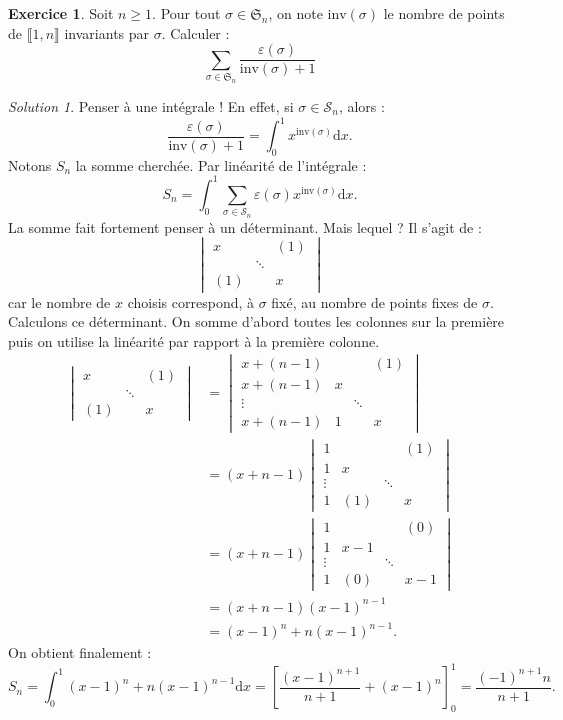 \documentclass[french]{book}
\renewcommand{\d}{\text{d}}
\theoremstyle{definition}
\newtheorem{ex}{Exercice}[chapter]
\theoremstyle{remark}
\newtheorem*{sol}{Solution}
\begin{document}
\begin{ex}
	Soit $n\geqslant1$. Pour tout $\sigma\in\mathfrak{S}_n$, on note $\text{inv}(\sigma)$ le nombre de points de $\llbracket1,n\rrbracket$ invariants par $\sigma$. Calculer : $$\sum_{\sigma\in\mathfrak{S}_n}\frac{\varepsilon(\sigma)}{\text{inv}(\sigma)+1}$$
\end{ex}
\begin{sol}
	Penser à une intégrale ! En effet, si $\sigma\in\mathcal{S}_n$, alors :
	$$\frac{\varepsilon(\sigma)}{\text{inv}(\sigma)+1}=\int_{0}^{1}x^{\text{inv}(\sigma)}\d x.$$ Notons $S_n$ la somme cherchée. Par linéarité de l'intégrale :
	$$S_n=\int_{0}^{1}\sum_{\sigma\in\mathcal{S}_n}\varepsilon(\sigma)x^{\text{inv}(\sigma)}\d x.$$
	La somme fait fortement penser à un déterminant. Mais lequel ? Il s'agit de :
	$$\begin{vmatrix}
		x&&(1)\\
		&\ddots&\\
		(1)&&x
	\end{vmatrix}$$ car le nombre de $x$ choisis correspond, à $\sigma$ fixé, au nombre de points fixes de $\sigma$. Calculons ce déterminant. On somme d'abord toutes les colonnes sur la première puis on utilise la linéarité par rapport à la première colonne.
	\begin{align*}
		\begin{vmatrix}
			x&&(1)\\
			&\ddots&\\
			(1)&&x
		\end{vmatrix}&=\begin{vmatrix}
		x+(n-1)&&&(1)\\
		x+(n-1)&x&&\\
		\vdots&&\ddots&\\
		x+(n-1)&1&&x
		\end{vmatrix}\\
		&=(x+n-1)\begin{vmatrix}
			1&&&(1)\\
			1&x&&\\
			\vdots&&\ddots&\\
			1&(1)&&x
		\end{vmatrix}\\
		&=(x+n-1)\begin{vmatrix}
			1&&&(0)\\
			1&x-1&&\\
			\vdots&&\ddots&\\
			1&(0)&&x-1
		\end{vmatrix}\\
		&=(x+n-1)(x-1)^{n-1}\\
		&=(x-1)^n+n(x-1)^{n-1}.
	\end{align*}
	On obtient finalement :
	$$S_n=\int_{0}^{1}(x-1)^n+n(x-1)^{n-1}\d x=\left[\frac{(x-1)^{n+1}}{n+1}+(x-1)^n\right]_0^1=\frac{(-1)^{n+1}n}{n+1}.$$
\end{sol}
\end{document}
